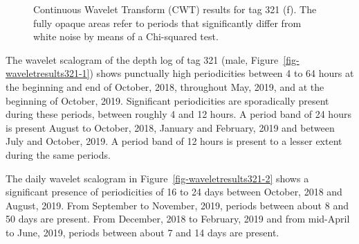 \documentclass[
  authoryear,
  review,
  3p]{elsarticle}
\begin{document}
\begin{figure}

\begin{minipage}[t]{\linewidth}

{\centering 


}

\end{minipage}%
\newline
\begin{minipage}[t]{\linewidth}

{\centering 


}

\end{minipage}%

\caption{\label{fig-waveletresults321}Continuous Wavelet Transform (CWT)
results for tag 321 (f). The fully opaque areas refer to periods that
significantly differ from white noise by means of a Chi-squared test.}

\end{figure}

The wavelet scalogram of the depth log of tag 321 (male,
Figure~\ref{fig-waveletresults321-1}) shows punctually high
periodicities between 4 to 64 hours at the beginning and end of October,
2018, throughout May, 2019, and at the beginning of October, 2019.
Significant periodicities are sporadically present during these periods,
between roughly 4 and 12 hours. A period band of 24 hours is present
August to October, 2018, January and February, 2019 and between July and
October, 2019. A period band of 12 hours is present to a lesser extent
during the same periods.

The daily wavelet scalogram in Figure~\ref{fig-waveletresults321-2}
shows a significant presence of periodicities of 16 to 24 days between
October, 2018 and August, 2019. From September to November, 2019,
periods between about 8 and 50 days are present. From December, 2018 to
February, 2019 and from mid-April to June, 2019, periods between about 7
and 14 days are present.
\end{document}
